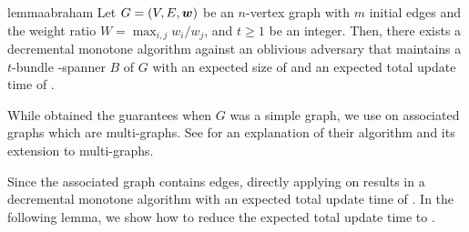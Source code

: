 \begin{restatable}{lemma}{abraham}\label{lem:Abraham_decremental_t-bundle}
Let \( G = (V, E, \boldsymbol{w}) \) be an \( n \)-vertex graph with \( m \) initial edges and the weight ratio \( W = \max _{i,j} w_i / w_j \), and \( t \geq 1 \) be an integer.
Then, there exists a decremental monotone algorithm against an oblivious adversary that maintains a \( t \)-bundle -spanner \( B \) of \( G \) with an expected size of  and an expected total update time of .
\end{restatable}

\begin{remark}
While \cite{Abraham:2016aa} obtained the guarantees when \( G \) was a simple graph, we use  on associated graphs which are multi-graphs.
See  for an explanation of their algorithm and its extension to multi-graphs.
\end{remark}


Since the associated graph  contains  edges, directly applying  on  results in a decremental monotone algorithm with an expected total update time of .
In the following lemma, we show how to reduce the expected total update time to .


